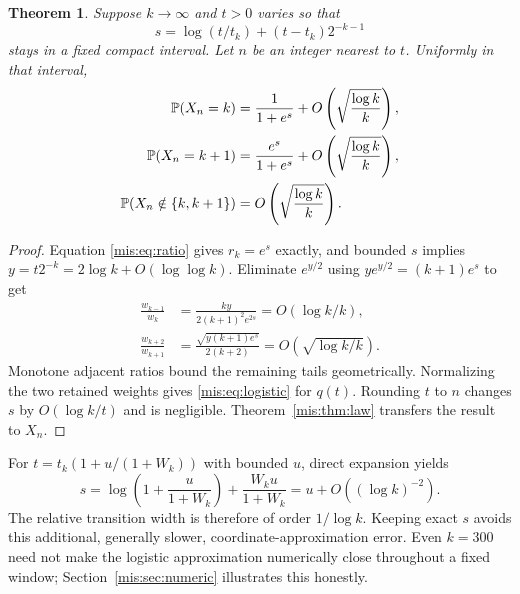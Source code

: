 \documentclass[11pt]{article}
\newtheorem{theorem}{Theorem}[section]
\theoremstyle{remark}\newtheorem{remark}[theorem]{Remark}
\newcommand{\Prob}{\mathbb P}
\begin{document}
\begin{theorem}\label{mis:thm:logistic}
Suppose $k\to\infty$ and $t>0$ varies so that
\begin{equation}\label{mis:eq:s}
 s=\log(t/t_k)+(t-t_k)2^{-k-1}
\end{equation}
stays in a fixed compact interval. Let $n$ be an integer nearest to $t$. Uniformly in that interval,
\begin{align}
 \Prob(X_n=k)&=\frac{1}{1+e^s}
                    +O\left(\sqrt{\frac{\log k}{k}}\right),\notag\\
 \Prob(X_n=k+1)&=\frac{e^s}{1+e^s}
                    +O\left(\sqrt{\frac{\log k}{k}}\right),\label{mis:eq:logistic}\\
 \Prob(X_n\notin\{k,k+1\})&=O\left(\sqrt{\frac{\log k}{k}}\right).\notag
\end{align}
\end{theorem}
\begin{proof}
Equation \eqref{mis:eq:ratio} gives $r_k=e^s$ exactly, and bounded $s$ implies
$y=t2^{-k}=2\log k+O(\log\log k)$. Eliminate $e^{y/2}$ using $ye^{y/2}=(k+1)e^s$ to get
\begin{align*}
 \frac{w_{k-1}}{w_k}&=\frac{k y}{2(k+1)^2e^{2s}}
                        =O(\log k/k),\\
 \frac{w_{k+2}}{w_{k+1}}&=\frac{\sqrt{y(k+1)e^s}}{2(k+2)}
                        =O\left(\sqrt{\log k/k}\right).
\end{align*}
Monotone adjacent ratios bound the remaining tails geometrically. Normalizing the two retained weights gives \eqref{mis:eq:logistic} for $q(t)$. Rounding $t$ to $n$ changes $s$ by $O(\log k/t)$ and is negligible. Theorem~\ref{mis:thm:law} transfers the result to $X_n$.
\end{proof}
For $t=t_k(1+u/(1+W_k))$ with bounded $u$, direct expansion yields
\[
 s=\log\left(1+\frac{u}{1+W_k}\right)+\frac{W_ku}{1+W_k}
   =u+O((\log k)^{-2}).
\]
The relative transition width is therefore of order $1/\log k$. Keeping exact $s$ avoids this additional, generally slower, coordinate-approximation error. Even $k=300$ need not make the logistic approximation numerically close throughout a fixed window; Section~\ref{mis:sec:numeric} illustrates this honestly.
\end{document}
